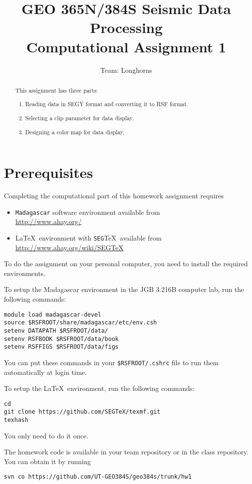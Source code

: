 \author{Team: Longhorns}
\title{GEO 365N/384S Seismic Data Processing \\ Computational Assignment 1}

\begin{abstract}
  This assignment has three parts:
  \begin{enumerate}
  \item Reading data in SEGY format and converting it to RSF format. 
  \item Selecting a clip parameter for data display.
  \item Designing a color map for data display.
  \end{enumerate}
\end{abstract}

\section{Prerequisites}

Completing the computational part of this homework assignment requires
\begin{itemize}
\item \texttt{Madagascar} software environment available from \\
\url{http://www.ahay.org/}
\item \LaTeX\ environment with \texttt{SEG}\TeX\ available from \\ 
\url{http://www.ahay.org/wiki/SEGTeX}
\end{itemize}
To do the assignment on your personal computer, you need to install
the required environments. 

To setup the Madagascar environment in the JGB 3.216B computer lab, run the following commands:
\begin{verbatim}
module load madagascar-devel
source $RSFROOT/share/madagascar/etc/env.csh
setenv DATAPATH $RSFROOT/data/
setenv RSFBOOK $RSFROOT/data/book
setenv RSFFIGS $RSFROOT/data/figs
\end{verbatim}
You can put these commands in your \verb+$RSFROOT/.cshrc+ file to run them automatically at login time.

To setup the \LaTeX\ environment, run the following commands:
\begin{verbatim}
cd
git clone https://github.com/SEGTeX/texmf.git
texhash
\end{verbatim}
You only need to do it once.

The homework code is available in your team repository or in the class
repository. You can obtain it by running
\begin{verbatim}
svn co https://github.com/UT-GEO384S/geo384s/trunk/hw1
\end{verbatim}

